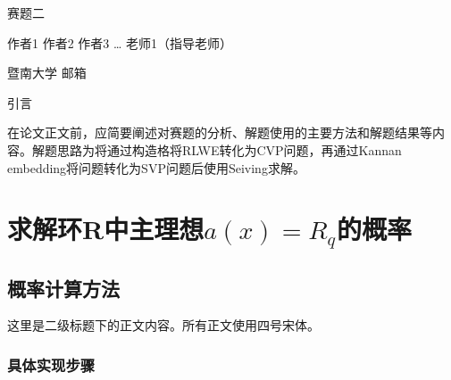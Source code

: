 \documentclass[12pt,a4paper]{article}
\newcommand{\fs}{\CJKfamily{fs}}
\numberwithin{equation}{section}
\begin{document}
\begin{center}
{\heiti\fontsize{16pt}{24pt}\selectfont 赛题二}
\end{center}

\begin{center}
{\fs\fontsize{12pt}{18pt}\selectfont 作者1 作者2 作者3 … 老师1（指导老师）}
\end{center}

\begin{center}
{\songti\fontsize{10.5pt}{15.75pt}\selectfont 暨南大学 \; 邮箱}
\end{center}

\vspace{1em}


\vspace{1em}


\vspace{2em}

{\centering\heiti\fontsize{16pt}{24pt}\selectfont 引言\par}
\vspace{1em}
在论文正文前，应简要阐述对赛题的分析、解题使用的主要方法和解题结果等内容。解题思路为将通过构造格将RLWE转化为CVP问题，再通过Kannan embedding将问题转化为SVP问题后使用Seiving求解。

\section{求解环R中主理想$a(x)=R_q$的概率}

\subsection{概率计算方法}

这里是二级标题下的正文内容。所有正文使用四号宋体。

\subsubsection{具体实现步骤}
\end{document}
